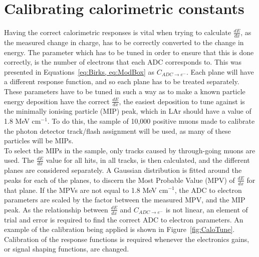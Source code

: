 \section{Calibrating calorimetric constants} \label{sec:MCCalib} %
Having the correct calorimetric responses is vital when trying to calculate $\frac{dE}{dx}$, as the measured change in charge, has to be correctly converted to the change in energy. The parameter which has to be tuned in order to ensure that this is done correctly, is the number of electrons that each ADC corresponds to. This was presented in Equations~\ref{eq:Birks, eq:ModBox} as $C_{ADC \rightarrow e^{-}}$. Each plane will have a different response function, and so each plane has to be treated separately. These parameters have to be tuned in such a way as to make a known particle energy deposition have the correct $\frac{dE}{dx}$, the easiest deposition to tune against is the minimally ionising particle (MIP) peak, which in LAr should have a value of 1.8 MeV cm$^{-1}$. To do this, the sample of 10,000 positive muons made to calibrate the photon detector track/flash assignment will be used, as many of these particles will be MIPs. \\

To select the MIPs in the sample, only tracks caused by through-going muons are used. The $\frac{dE}{dx}$ value for all hits, in all tracks, is then calculated, and the different planes are considered separately. A Gaussian distribution is fitted around the peaks for each of the planes, to discern the Most Probable Value (MPV) of $\frac{dE}{dx}$ for that plane. If the MPVs are not equal to 1.8 MeV cm$^{-1}$, the ADC to electron parameters are scaled by the factor between the measured MPV, and the MIP peak. As the relationship between $\frac{dE}{dx}$ and $C_{ADC \rightarrow e^{-}}$ is not linear, an element of trial and error is required to find the correct ADC to electron parameters. An example of the calibration being applied is shown in Figure~\ref{fig:CaloTune}. Calibration of the response functions is required whenever the electronics gains, or signal shaping functions, are changed.

